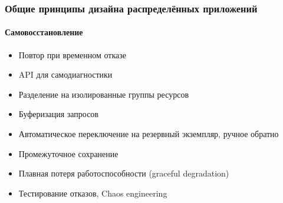\documentclass{../mcsslides}
\begin{document}
    \begin{frame}
        \frametitle{Общие принципы дизайна распределённых приложений}
        \framesubtitle{Самовосстановление}
        \begin{itemize}
            \item Повтор при временном отказе
            \item API для самодиагностики
            \item Разделение на изолированные группы ресурсов
            \item Буферизация запросов
            \item Автоматическое переключение на резервный экземпляр, ручное обратно
            \item Промежуточное сохранение
            \item Плавная потеря работоспособности (graceful degradation)
            \item Тестирование отказов, Chaos engineering
        \end{itemize}
    \end{frame}
\end{document}

